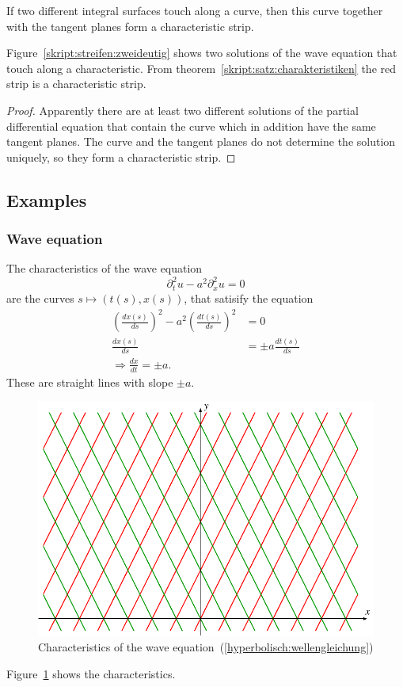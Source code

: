 \begin{satz}
\label{skript:satz:charakteristiken}
If two different integral surfaces touch along a curve,
then this curve together with the tangent planes form a characteristic strip.
\end{satz}

Figure~\ref{skript:streifen:zweideutig} shows two solutions of the wave
equation that touch along a characteristic.
From theorem~\ref{skript:satz:charakteristiken} the red strip is a 
characteristic strip.

\begin{proof}
Apparently there are at least two different solutions of the
partial differential equation that contain the curve which in
addition have the same tangent planes.
The curve and the tangent planes do not determine the solution
uniquely, so they form a characteristic strip.
\end{proof}

\subsection{Examples}
\subsubsection{Wave equation}
The characteristics of the wave equation
\begin{equation}
\partial_t^2u-a^2\partial_x^2u=0
\label{hyperbolisch:wellengleichung}
\end{equation}
are the curves $s\mapsto(t(s),x(s))$, that satisify the equation
\begin{align*}
\left(
\frac{dx(s)}{ds}\right)^2-a^2\left(\frac{dt(s)}{ds}\right)^2&=0
\\
\frac{dx(s)}{ds}
&=
\pm a\frac{dt(s)}{ds}
\\
\Rightarrow
\frac{dx}{dt}=\pm a.
\end{align*}
These are straight lines with slope $\pm a$.
\begin{figure}
\centering
\includegraphics{9-hyperbolic/images/wavechar.pdf}
\caption{Characteristics of the wave
equation~(\ref{hyperbolisch:wellengleichung})
\label{hyp:wellen}}
\end{figure}
Figure~\ref{hyp:wellen} shows the characteristics.

